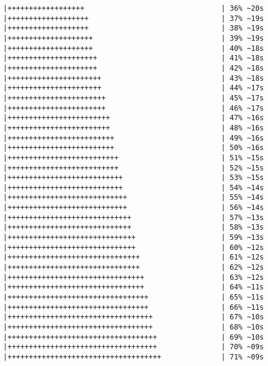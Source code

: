 \documentclass[12pt]{article}
\begin{document}
\begin{verbatim}
  |++++++++++++++++++                                | 36% ~20s          
  |+++++++++++++++++++                               | 37% ~19s          
  |+++++++++++++++++++                               | 38% ~19s          
  |++++++++++++++++++++                              | 39% ~19s          
  |++++++++++++++++++++                              | 40% ~18s          
  |+++++++++++++++++++++                             | 41% ~18s          
  |+++++++++++++++++++++                             | 42% ~18s          
  |++++++++++++++++++++++                            | 43% ~18s          
  |++++++++++++++++++++++                            | 44% ~17s          
  |+++++++++++++++++++++++                           | 45% ~17s          
  |+++++++++++++++++++++++                           | 46% ~17s          
  |++++++++++++++++++++++++                          | 47% ~16s          
  |++++++++++++++++++++++++                          | 48% ~16s          
  |+++++++++++++++++++++++++                         | 49% ~16s          
  |+++++++++++++++++++++++++                         | 50% ~16s          
  |++++++++++++++++++++++++++                        | 51% ~15s          
  |++++++++++++++++++++++++++                        | 52% ~15s          
  |+++++++++++++++++++++++++++                       | 53% ~15s          
  |+++++++++++++++++++++++++++                       | 54% ~14s          
  |++++++++++++++++++++++++++++                      | 55% ~14s          
  |++++++++++++++++++++++++++++                      | 56% ~14s          
  |+++++++++++++++++++++++++++++                     | 57% ~13s          
  |+++++++++++++++++++++++++++++                     | 58% ~13s          
  |++++++++++++++++++++++++++++++                    | 59% ~13s          
  |++++++++++++++++++++++++++++++                    | 60% ~12s          
  |+++++++++++++++++++++++++++++++                   | 61% ~12s          
  |+++++++++++++++++++++++++++++++                   | 62% ~12s          
  |++++++++++++++++++++++++++++++++                  | 63% ~12s          
  |++++++++++++++++++++++++++++++++                  | 64% ~11s          
  |+++++++++++++++++++++++++++++++++                 | 65% ~11s          
  |+++++++++++++++++++++++++++++++++                 | 66% ~11s          
  |++++++++++++++++++++++++++++++++++                | 67% ~10s          
  |++++++++++++++++++++++++++++++++++                | 68% ~10s          
  |+++++++++++++++++++++++++++++++++++               | 69% ~10s          
  |+++++++++++++++++++++++++++++++++++               | 70% ~09s          
  |++++++++++++++++++++++++++++++++++++              | 71% ~09s          

\end{verbatim}
\end{document}
